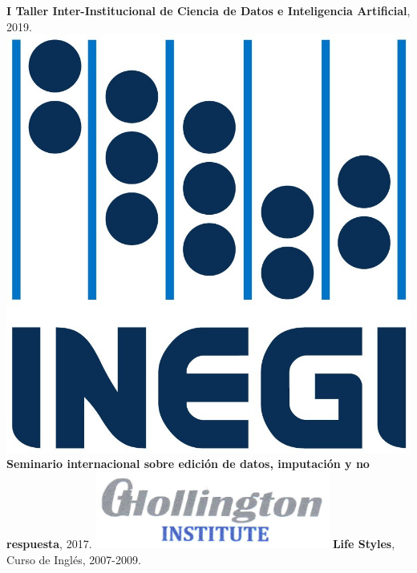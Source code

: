 \documentclass[]{friggeri-cv}
\begin{document}
\begin{aside}
	\textbf{I Taller Inter-Institucional de Ciencia de Datos e Inteligencia Artificial}, 2019.
	\includegraphics[scale=0.04]{img/inegi.jpg}
	\textbf{Seminario internacional sobre edición de datos, imputación y no respuesta}, 2017.
	\includegraphics[scale=0.25]{img/hollington.png}
	\textbf{Life Styles}, Curso de Inglés, 2007-2009.
\end{aside}
\end{document}

